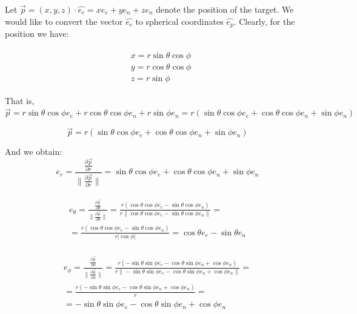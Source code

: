 \documentclass{article}
\newcommand{\east}{e_e}
\newcommand{\north}{e_n}
\newcommand{\up}{e_n}
\newcommand{\range}{e_r}
\newcommand{\bearing}{e_\theta}
\newcommand{\elevation}{e_\phi}
\newcommand{\carvec}{\hat{e_{c}}}
\newcommand{\polvec}{\hat{e_{p}}}
\begin{document}
Let $\vec{p} = (x,y,z) \cdot \carvec = x\east + y\north + z\up$ denote the
position of the target. We would like to convert the vector $\carvec$ to spherical
coordinates $\polvec$.
Clearly, for the position we have:

\begin{align}
\begin{split}
{}& x=r\sin \theta \cos \phi \\
{}& y=r\cos \theta \cos \phi \\
{}& z=r\sin \phi
\end{split}
\end{align}

That is, $\vec{p} = r\sin \theta \cos \phi \east + r\cos \theta \cos \phi \north +
r\sin \phi \up = r( \sin \theta \cos \phi \east + \cos \theta \cos \phi \north +
\sin \phi \up)$

\begin{equation}
\vec{p} = r( \sin \theta \cos \phi \east + \cos \theta \cos \phi \north +
\sin \phi \up)
\end{equation}

And we obtain:
\begin{equation}\label{eq:range}
\range = \frac{\frac{\partial \vec{p}}{\partial r}}{\| \frac{\partial
\vec{p}}{\partial r} \|} = \sin \theta \cos \phi \east + \cos \theta \cos \phi \north +
\sin \phi \up 
\end{equation}

\begin{align}\label{eq:bearing}
\begin{split}
\bearing = \frac{\frac{\partial \vec{p}}{\partial \theta}}{\| \frac{\partial
\vec{p}}{\partial \theta} \|} = \frac{r( \cos \theta \cos \phi \east - \sin
\theta \cos \phi \north) }{r \| \cos \theta \cos \phi \east - \sin \theta
\cos \phi \north\|} = \\
= \frac{r( \cos \theta \cos \phi \east - \sin \theta
\cos \phi \north) }{r |\cos \phi |} = \cos \theta \east - \sin \theta \north
\end{split}
\end{align}

\begin{align}
\begin{split}
\elevation = \frac{\frac{\partial \vec{p}}{\partial \phi}}{\| \frac{\partial
\vec{p}}{\partial \phi} \|} = \frac{r( - \sin \theta \sin \phi \east - \cos
\theta \sin \phi \north + \cos \phi \up) }{r \| - \sin \theta \sin \phi \east - \cos
\theta \sin \phi \north + \cos \phi \up \|} = \\
= \frac{r( - \sin \theta \sin \phi \east - \cos
\theta \sin \phi \north + \cos \phi \up) }{r} = \\
= - \sin \theta \sin \phi \east
- \cos \theta \sin \phi \north + \cos \phi \up
\end{split}
\end{align}
\end{document}
